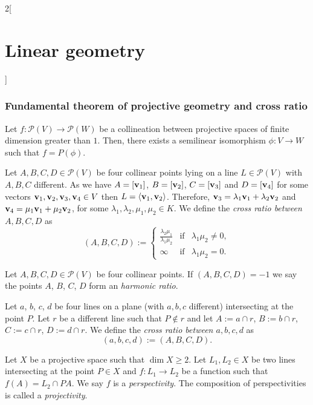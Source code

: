 \documentclass[../../../main.tex]{subfiles}
\begin{document}
\begin{multicols}{2}[\section{Linear geometry}]
    \subsubsection{Fundamental theorem of projective geometry and cross ratio}
    \begin{theorem}
        Let $f:\mathcal{P}(V)\rightarrow \mathcal{P}(W)$ be a collineation between projective spaces of finite dimension greater than $1$. Then, there exists a semilinear isomorphism $\phi:V\rightarrow W$ such that $f=P(\phi)$.
    \end{theorem}
    \begin{definition}
        Let $A,B,C,D\in\mathcal{P}(V)$ be four collinear points lying on a line $L\in\mathcal{P}(V)$ with $A,B,C$ different. As we have $A=[\boldsymbol{\mathrm{v}}_1]$, $B=[\boldsymbol{\mathrm{v}}_2]$, $C=[\boldsymbol{\mathrm{v}}_3]$ and $D=[\boldsymbol{\mathrm{v}}_4]$ for some vectors $\boldsymbol{\mathrm{v}}_1,\boldsymbol{\mathrm{v}}_2,\boldsymbol{\mathrm{v}}_3,\boldsymbol{\mathrm{v}}_4\in V$ then $L=\langle \boldsymbol{\mathrm{v}}_1,\boldsymbol{\mathrm{v}}_2\rangle$. Therefore, $\boldsymbol{\mathrm{v}}_3=\lambda_1\boldsymbol{\mathrm{v}}_1+\lambda_2\boldsymbol{\mathrm{v}}_2$ and $\boldsymbol{\mathrm{v}}_4=\mu_1\boldsymbol{\mathrm{v}}_1+\mu_2\boldsymbol{\mathrm{v}}_2$, for some $\lambda_1,\lambda_2,\mu_1,\mu_2\in K$. We define the \textit{cross ratio between $A,B,C,D$} as $$(A,B,C,D):=\left\{
            \begin{array}{ccc}
                \displaystyle\frac{\lambda_2\mu_1}{\lambda_1\mu_2} & \text{if} & \lambda_1\mu_2\ne0, \\
                \infty                                             & \text{if} & \lambda_1\mu_2=0.
            \end{array}\right.$$
    \end{definition}
    \begin{definition}
        Let $A,B,C,D\in\mathcal{P}(V)$ be four collinear points. If $(A,B,C,D)=-1$ we say the points $A$, $B$, $C$, $D$ form an \textit{harmonic ratio}.
    \end{definition}
    \begin{definition}
        Let $a$, $b$, $c$, $d$ be four lines on a plane (with $a,b,c$ different) intersecting at the point $P$. Let $r$ be a different line such that $P\notin r$ and let $A:=a\cap r$, $B:=b\cap r$, $C:=c\cap r$, $D:=d\cap r$. We define the \textit{cross ratio between $a,b,c,d$} as $$(a,b,c,d):=(A,B,C,D).$$
    \end{definition}
    \begin{definition}
        Let $X$ be a projective space such that $\dim X\geq 2$. Let $L_1,L_2\in X$ be two lines intersecting at the point $P\in X$ and $f:L_1\rightarrow L_2$ be a function such that $f(A)=L_2\cap PA$. We say $f$ is a \textit{perspectivity}. The composition of perspectivities is called a \textit{projectivity}.

\end{definition}
\end{multicols}
\end{document}
